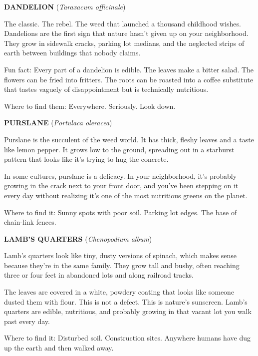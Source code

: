 \documentclass[
    language=english,
    doctype=zine,
    institution=none,
]{../../omnilatex}
\begin{document}
\begin{center}
\begin{minipage}{0.9\textwidth}

\textbf{DANDELION} (\textit{Taraxacum officinale})

The classic. The rebel. The weed that launched a thousand childhood wishes. Dandelions are the first sign that nature hasn't given up on your neighborhood. They grow in sidewalk cracks, parking lot medians, and the neglected strips of earth between buildings that nobody claims.

Fun fact: Every part of a dandelion is edible. The leaves make a bitter salad. The flowers can be fried into fritters. The roots can be roasted into a coffee substitute that tastes vaguely of disappointment but is technically nutritious.

Where to find them: Everywhere. Seriously. Look down.

\vspace{0.3cm}

\textbf{PURSLANE} (\textit{Portulaca oleracea})

Purslane is the succulent of the weed world. It has thick, fleshy leaves and a taste like lemon pepper. It grows low to the ground, spreading out in a starburst pattern that looks like it's trying to hug the concrete.

In some cultures, purslane is a delicacy. In your neighborhood, it's probably growing in the crack next to your front door, and you've been stepping on it every day without realizing it's one of the most nutritious greens on the planet.

Where to find it: Sunny spots with poor soil. Parking lot edges. The base of chain-link fences.

\vspace{0.3cm}

\textbf{LAMB'S QUARTERS} (\textit{Chenopodium album})

Lamb's quarters look like tiny, dusty versions of spinach, which makes sense because they're in the same family. They grow tall and bushy, often reaching three or four feet in abandoned lots and along railroad tracks.

The leaves are covered in a white, powdery coating that looks like someone dusted them with flour. This is not a defect. This is nature's sunscreen. Lamb's quarters are edible, nutritious, and probably growing in that vacant lot you walk past every day.

Where to find it: Disturbed soil. Construction sites. Anywhere humans have dug up the earth and then walked away.


\end{minipage}
\end{center}
\end{document}
